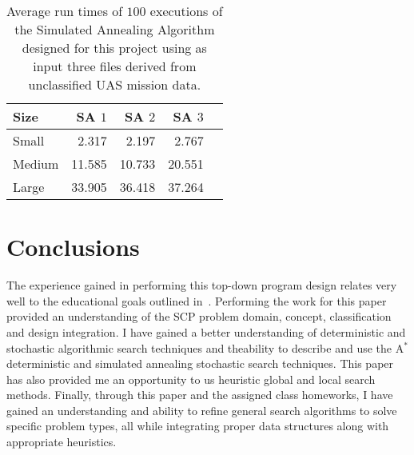 \documentclass[conference]{IEEEtran}
\begin{document}
\begin{table}[ht!]
  \centering
  \caption{Average run times of $100$ executions of the Simulated Annealing
  Algorithm designed for this project using as input three files derived from
  unclassified UAS mission data.}
  \label{tab:SAResults}
  \begin{tabular}{ | l | r | r | r | r | }
  \hline
    Size     &  SA $1$  &  SA $2$  &   SA $3$ \\ \hline\hline
    Small    &   2.317  &   2.197  &    2.767 \\ \hline
    Medium   &  11.585  &  10.733  &   20.551 \\ \hline
    Large    &  33.905  &  36.418  &   37.264 \\ \hline
  \end{tabular}
\end{table}

\section{Conclusions} \label{sec:conclusion}


The experience gained in performing this top-down program design relates very
well to the educational goals outlined in~\cite{lamontSyllabus}. Performing the
work for this paper provided an understanding of the SCP problem domain,
concept, classification and design integration. I have gained a better
understanding of deterministic and stochastic algorithmic search techniques and
theability to describe and use the A$^*$ deterministic and simulated annealing
stochastic search techniques. This paper has also provided me an opportunity to
us heuristic global and local search methods. Finally, through this paper and
the assigned class homeworks, I have gained an understanding and ability to
refine general search algorithms to solve specific problem types, all while
integrating proper data structures along with appropriate heuristics. 
\end{document}
